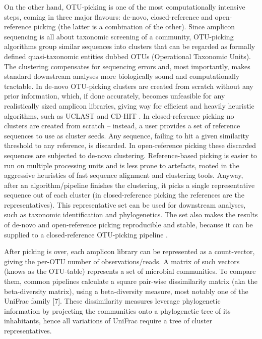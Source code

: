 \documentclass[10pt,letterpaper]{article}
\begin{document}
On the other hand, OTU-picking is one of the most computationally intensive steps, coming in three major flavours: 
de-novo, closed-reference and open-reference picking (the latter is a combination of the other). 
Since amplicon sequencing is all about taxonomic screening of a community, OTU-picking algorithms group similar 
sequences into clusters that can be regarded as formally defined quasi-taxonomic entities dubbed OTUs (Operational 
Taxonomic Units). The clustering compensates for sequencing errors and, most importantly, makes standard downstream 
analyses more biologically sound and computationally tractable. In de-novo OTU-picking clusters are created from scratch 
without any prior information, which, if done accurately, becomes unfeasible for any realistically sized amplicon libraries, 
giving way for efficient and heavily heuristic algorithms, such as UCLAST \cite{} and CD-HIT \cite{}. In closed-reference picking 
no clusters are created from scratch – instead, a user provides a set of reference sequences to use as cluster seeds. 
Any sequence, failing to hit a given similarity threshold to any reference, is discarded. In open-reference picking 
these discarded sequences are subjected to de-novo clustering. Reference-based picking is easier to run on multiple 
processing units and is less prone to artefacts, rooted in the aggressive heuristics of fast sequence alignment and 
clustering tools. Anyway, after an algorithm/pipeline finishes the clustering, it picks a single representative sequence 
out of each cluster (in closed-reference picking the references are the representatives). This representative set can be 
used for downstream analyses, such as taxonomic identification and phylogenetics. The set also makes the results of 
de-novo and open-reference picking reproducible and stable, because it can be supplied to a closed-reference OTU-picking 
pipeline \cite{}.

After picking is over, each amplicon library can be represented as a count-vector, giving the per-OTU number of 
observations/reads. A matrix of such vectors (knows as the OTU-table) represents a set of microbial communities. 
To compare them, common pipelines calculate a square pair-wise dissimilarity matrix (aka the beta-diversity matrix), 
using a beta-diversity measure, most notably one of the UniFrac family [7]. These dissimilarity measures leverage 
phylogenetic information by projecting the communities onto a phylogenetic tree of its inhabitants, hence all variations 
of UniFrac require a tree of cluster representatives.
\end{document}
